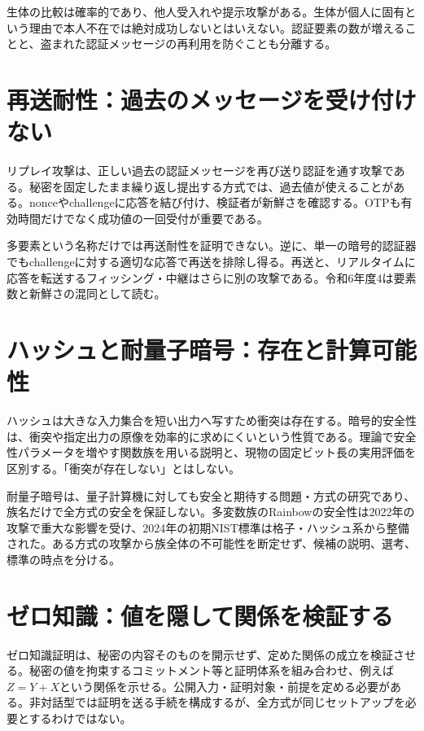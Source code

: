 生体の比較は確率的であり、他人受入れや提示攻撃がある。生体が個人に固有という理由で本人不在では絶対成功しないとはいえない\cite{net_nist2017}。認証要素の数が増えることと、盗まれた認証メッセージの再利用を防ぐことも分離する。

\section{再送耐性：過去のメッセージを受け付けない}
\label{theory:network:replay}
リプレイ攻撃は、正しい過去の認証メッセージを再び送り認証を通す攻撃である。秘密を固定したまま繰り返し提出する方式では、過去値が使えることがある。nonceやchallengeに応答を結び付け、検証者が新鮮さを確認する。OTPも有効時間だけでなく成功値の一回受付が重要である\cite{net_nist2017}。

多要素という名称だけでは再送耐性を証明できない。逆に、単一の暗号的認証器でもchallengeに対する適切な応答で再送を排除し得る。再送と、リアルタイムに応答を転送するフィッシング・中継はさらに別の攻撃である。令和6年度4は要素数と新鮮さの混同として読む。

\section{ハッシュと耐量子暗号：存在と計算可能性}
\label{theory:network:hash}
ハッシュは大きな入力集合を短い出力へ写すため衝突は存在する。暗号的安全性は、衝突や指定出力の原像を効率的に求めにくいという性質である\cite{net_hash}。理論で安全性パラメータを増やす関数族を用いる説明と、現物の固定ビット長の実用評価を区別する。「衝突が存在しない」とはしない。

耐量子暗号は、量子計算機に対しても安全と期待する問題・方式の研究であり、族名だけで全方式の安全を保証しない。多変数族のRainbowの安全性は2022年の攻撃で重大な影響を受け、2024年の初期NIST標準は格子・ハッシュ系から整備された\cite{net_pq2022,net_pq2024}。ある方式の攻撃から族全体の不可能性を断定せず、候補の説明、選考、標準の時点を分ける。

\section{ゼロ知識：値を隠して関係を検証する}
\label{theory:network:zkp}
ゼロ知識証明は、秘密の内容そのものを開示せず、定めた関係の成立を検証させる。秘密の値を拘束するコミットメント等と証明体系を組み合わせ、例えば$Z=Y+X$という関係を示せる。公開入力・証明対象・前提を定める必要がある\cite{net_zkp2021}。非対話型では証明を送る手続を構成するが、全方式が同じセットアップを必要とするわけではない。

